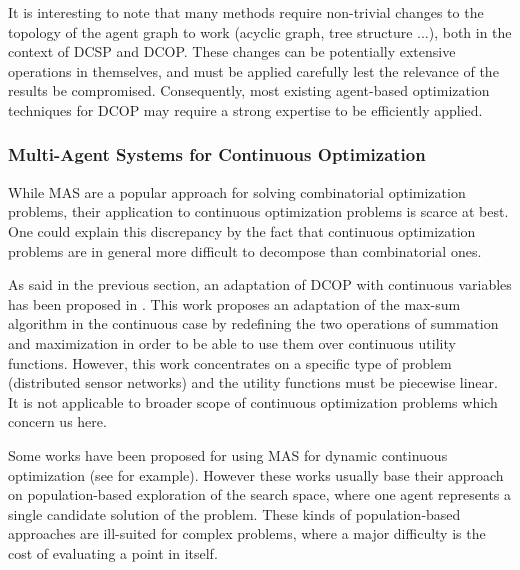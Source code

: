 It is interesting to note that many methods require non-trivial changes to the topology of the agent graph to work (acyclic graph, tree structure ...), both in the context of DCSP and DCOP. These changes can  be potentially extensive operations in themselves, and must be applied carefully lest the relevance of the results be compromised. Consequently, most existing agent-based optimization techniques for DCOP may require a strong expertise to be efficiently applied\cite{Ka2011.6}.

\subsubsection{Multi-Agent Systems for Continuous Optimization}

While MAS are a popular approach for solving combinatorial optimization problems, their application to continuous optimization problems is scarce at best. One could explain this discrepancy by the fact that continuous optimization problems are in general more difficult to decompose than combinatorial ones.

As said in the previous section, an adaptation of DCOP with continuous variables has been proposed in \cite{stranders2009decentralised}. This work proposes an adaptation of the max-sum algorithm in the continuous case by redefining the two operations of summation and maximization in order to be able to use them over continuous utility functions. However, this work concentrates on a specific type of problem (distributed sensor networks) and the utility functions must be piecewise linear. It is not applicable to broader scope of continuous optimization problems which concern us here.

Some works have been proposed for using MAS for dynamic continuous optimization (see \cite{lepagnot2010new} for example). However these works usually base their approach on population-based exploration of the search space, where one agent represents a single candidate solution of the problem. These kinds of population-based approaches are ill-suited for complex problems, where a major difficulty is the cost of evaluating a point in itself.

